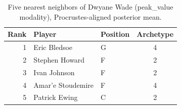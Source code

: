 \begin{table}[htbp]
  \centering\small
  \begin{tabular}{rllc}
    \toprule
    Rank & Player & Position & Archetype \\
    \midrule
    1 & Eric Bledsoe & G & 4 \\
    2 & Stephen Howard & F & 2 \\
    3 & Ivan Johnson & F & 2 \\
    4 & Amar'e Stoudemire & F & 4 \\
    5 & Patrick Ewing & C & 2 \\
    \bottomrule
  \end{tabular}
  \caption{Five nearest neighbors of Dwyane Wade (peak_value modality), Procrustes-aligned posterior mean.}
  \label{tab:Dwyane_Wade_neighbors_peak_value}
\end{table}

